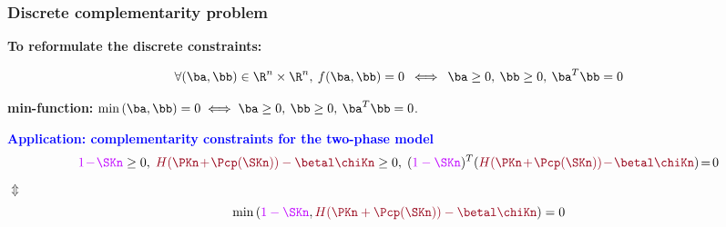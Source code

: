 \documentclass[10 pt]{beamer}
\begin{document}
\begin{frame}
\frametitle{Discrete complementarity problem}
\alert{\textbf{To reformulate the discrete constraints:}}
\vspace{0.2 cm}
\begin{definition}[C-function]
\begin{equation*}
\forall(\ba,\bb)\in {\R}^n \times \R^n, \: f(\ba,\bb)=0 \: \iff \:
\ba \geq0, \: \bb \geq0, \: \ba^{T} \bb=0
\end{equation*}
\end{definition}
\vspace{0.3 cm}
\textcolor{cadmiumgreen}{\textbf{min-function:}}  $\min\left(\ba,\bb\right)=0 \iff \ba \geq0, \: \bb \geq0, \: \ba^{T} \bb=0$.

\pause
\vspace{0.3 cm}
\textcolor{blue}{\textbf{Application: complementarity constraints for the two-phase model}}
\begin{equation*}
\textcolor{electricpurple}{1\hspace{-0.05 cm}-\hspace{-0.05 cm}\SKn} \geq 0, \;  \textcolor{carmine}{H(\PKn\hspace{-0.05 cm}+\hspace{-0.05 cm}\Pcp(\SKn))-\betal \chiKn} \geq 0, \; (\textcolor{electricpurple}{1-\SKn})^T (\textcolor{carmine}{H(\PKn\hspace{-0.05 cm}+\hspace{-0.05 cm}\Pcp(\SKn))\hspace{-0.05 cm}-\hspace{-0.05 cm}\betal \chiKn}) \hspace{-0.05 cm}= \hspace{-0.05 cm}0
\end{equation*}
\hspace{6 cm}${\bm \Updownarrow}$
\begin{equation*} 
\min\left(\textcolor{electricpurple}{1-\SKn},\textcolor{carmine}{H(\PKn+\Pcp(\SKn))-\betal \chiKn}\right)=0
\end{equation*}
\end{frame}
\end{document}
